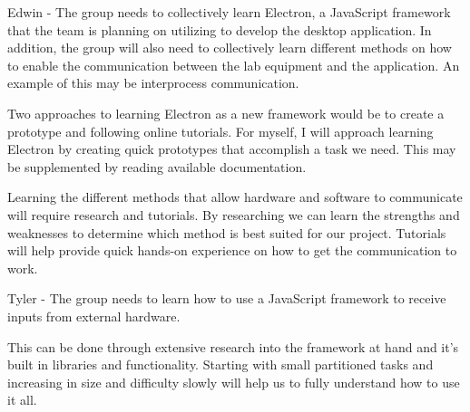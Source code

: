 \documentclass[12pt, titlepage]{article}
\begin{document}
Edwin - The group needs to collectively learn Electron, a JavaScript framework that the team is planning on utilizing to develop the desktop application. In addition, the group will also need to collectively learn different methods on how to enable the communication between the lab equipment and the application. An example of this may be interprocess communication.

Two approaches to learning Electron as a new framework would be to create a prototype and following online tutorials. For myself, I will approach learning Electron by creating quick prototypes that accomplish a task we need. This may be supplemented by reading available documentation.

Learning the different methods that allow hardware and software to communicate will require research and tutorials. By researching we can learn the strengths and weaknesses to determine which method is best suited for our project. Tutorials will help provide quick hands-on experience on how to get the communication to work.

Tyler - The group needs to learn how to use a JavaScript framework to receive inputs from external hardware. 

This can be done through extensive research into the framework at hand and it's built in libraries and functionality. Starting with small partitioned tasks and increasing in size and difficulty slowly will help us to fully understand how to use it all.
\end{document}
